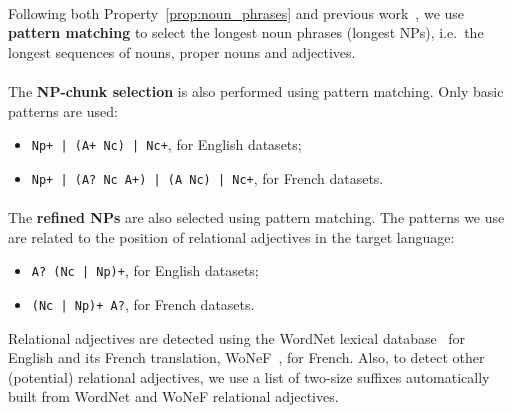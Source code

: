       \paragraph{}
      Following both Property~\ref{prop:noun_phrases} and previous
      work~\cite{hassan2010conundrums}, we use \textbf{pattern matching} to
      select the longest noun phrases (longest NPs), i.e.~the longest sequences
      of nouns, proper nouns and adjectives.

      \paragraph{}
      The \textbf{NP-chunk selection} is also performed using pattern matching.
      Only basic patterns are used:
      \begin{itemize}
        \item{\verb:Np+ | (A+ Nc) | Nc+:, for English datasets;}
        \item{\verb:Np+ | (A? Nc A+) | (A Nc) | Nc+:, for French datasets.}
      \end{itemize}

      \paragraph{}
      The \textbf{refined NPs} are also selected using pattern matching. The
      patterns we use are related to the position of relational adjectives in
      the target language:
      \begin{itemize}
        \item{\verb:A? (Nc | Np)+:, for English datasets;}
        \item{\verb:(Nc | Np)+ A?:, for French datasets.}
      \end{itemize}
      Relational adjectives are detected using the WordNet lexical
      database~\cite{miller1995wordnet} for English and its French translation,
      WoNeF~\cite{pradet2013wonef}, for French. Also, to detect other
      (potential) relational adjectives, we use a list of two-size suffixes
      automatically built from WordNet and WoNeF relational adjectives.

